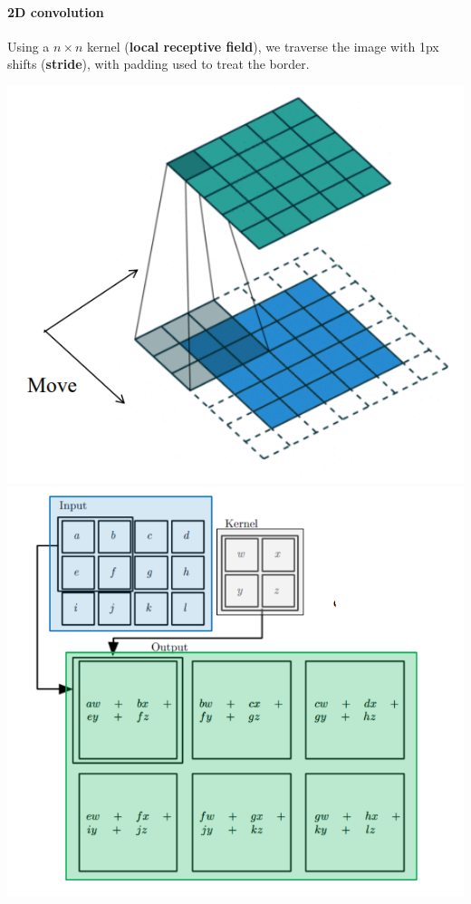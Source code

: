 \documentclass[10pt]{report}
\begin{document}
\paragraph{2D convolution} Using a $n\times n$ kernel (\textbf{local receptive field}), we traverse the image with 1px shifts (\textbf{stride}), with padding used to treat the border.\begin{center}
	\includegraphics[scale=0.5]{27.png}\\
	\includegraphics[scale=0.5]{28.png}
\end{center}
\end{document}
